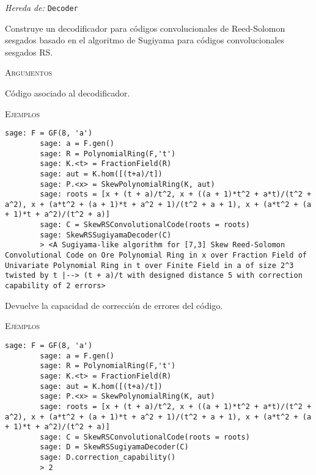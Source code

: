 \begin{description}[leftmargin=1em, font=\normalfont\ttfamily, style=nextline]
    \item[class SkewRSSugiyamaDecoder(self,code)]
    
    \emph{Hereda de: } \texttt{Decoder}

    Construye un decodificador para códigos convolucionales de Reed-Solomon sesgados basado en el algoritmo de Sugiyama para códigos convolucionales sesgados RS.

    \textsc{Argumentos}

    \begin{description}[font=\normalfont\ttfamily]
        \item[code] Código asociado al decodificador.
    \end{description}

    \textsc{Ejemplos}

    \begin{lstlisting}[gobble=8]
        sage: F = GF(8, 'a')
        sage: a = F.gen()
        sage: R = PolynomialRing(F,'t')
        sage: K.<t> = FractionField(R)
        sage: aut = K.hom([(t+a)/t])
        sage: P.<x> = SkewPolynomialRing(K, aut)
        sage: roots = [x + (t + a)/t^2, x + ((a + 1)*t^2 + a*t)/(t^2 + a^2), x + (a*t^2 + (a + 1)*t + a^2 + 1)/(t^2 + a + 1), x + (a*t^2 + (a + 1)*t + a^2)/(t^2 + a)]
        sage: C = SkewRSConvolutionalCode(roots = roots) 
        sage: SkewRSSugiyamaDecoder(C)
        > <A Sugiyama-like algorithm for [7,3] Skew Reed-Solomon Convolutional Code on Ore Polynomial Ring in x over Fraction Field of Univariate Polynomial Ring in t over Finite Field in a of size 2^3 twisted by t |--> (t + a)/t with designed distance 5 with correction capability of 2 errors>
    \end{lstlisting}     


    \begin{description}[font=\ttfamily,style = nextline]
        \item[correction\_capability(self)] Devuelve la capacidad de corrección de errores del código.    
    \end{description}

    \textsc{Ejemplos}

    \begin{lstlisting}[gobble=8]
        sage: F = GF(8, 'a')
        sage: a = F.gen()
        sage: R = PolynomialRing(F,'t')
        sage: K.<t> = FractionField(R)
        sage: aut = K.hom([(t+a)/t])
        sage: P.<x> = SkewPolynomialRing(K, aut)
        sage: roots = [x + (t + a)/t^2, x + ((a + 1)*t^2 + a*t)/(t^2 + a^2), x + (a*t^2 + (a + 1)*t + a^2 + 1)/(t^2 + a + 1), x + (a*t^2 + (a + 1)*t + a^2)/(t^2 + a)]
        sage: C = SkewRSConvolutionalCode(roots = roots) 
        sage: D = SkewRSSugiyamaDecoder(C)
        sage: D.correction_capability()
        > 2
    \end{lstlisting}     


\end{description}
